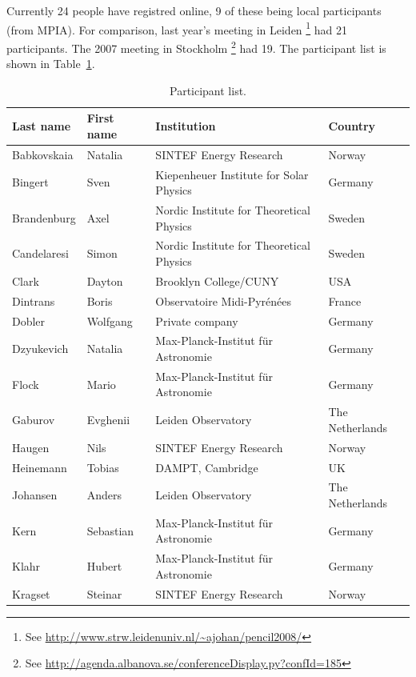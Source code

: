 \documentclass{article}
\begin{document}
Currently 24 people have registred online, 9 of these being local participants (from MPIA). 
For comparison, last year's meeting in 
Leiden{
\footnote{See \url{http://www.strw.leidenuniv.nl/~ajohan/pencil2008/}}} 
had 21 participants. 
The 2007 meeting in Stockholm{
\footnote{See \url{http://agenda.albanova.se/conferenceDisplay.py?confId=185}}} 
had 19. The participant list is shown in Table~\ref{tab:participants}.
\\ 
\begin{table}
\caption[]{Participant list.}
\label{tab:participants}
\begin{center}
  \begin{tabular}{llll}\hline
    Last name & First name & Institution & Country\\
    \hline
    Babkovskaia &  Natalia     &  SINTEF Energy Research & Norway\\
    Bingert     &  Sven        &  Kiepenheuer Institute for Solar Physics & Germany\\
    Brandenburg &  Axel        &  Nordic Institute for Theoretical Physics & Sweden\\
    Candelaresi &  Simon       &  Nordic Institute for Theoretical Physics & Sweden\\
    Clark       &  Dayton      &  Brooklyn College/CUNY & USA\\
    Dintrans    &  Boris       &  Observatoire Midi-Pyr\'en\'ees & France\\
    Dobler      &  Wolfgang    &  Private company & Germany\\
    Dzyukevich  &  Natalia     &  Max-Planck-Institut f\"ur Astronomie & Germany\\
    Flock       &  Mario       &  Max-Planck-Institut f\"ur Astronomie & Germany\\
    Gaburov     &  Evghenii    &  Leiden Observatory & The Netherlands \\
    Haugen      &  Nils        &  SINTEF Energy Research & Norway\\
    Heinemann   &  Tobias      &  DAMPT, Cambridge & UK \\
    Johansen    &  Anders      &  Leiden Observatory & The Netherlands\\
    Kern        &  Sebastian   &  Max-Planck-Institut f\"ur Astronomie & Germany\\
    Klahr       &  Hubert      &  Max-Planck-Institut f\"ur Astronomie & Germany\\
    Kragset     &  Steinar     &  SINTEF Energy Research & Norway\\

\end{tabular}
\end{center}
\end{table}
\end{document}
